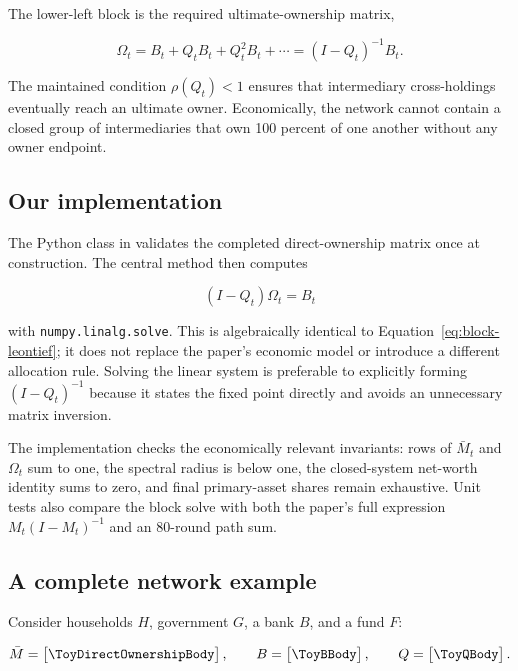 \documentclass[11pt]{article}
\newcommand{\matM}{\bar M}
\newcommand{\code}[1]{\texttt{#1}}
\begin{document}
The lower-left block is the required ultimate-ownership matrix,

\begin{equation}
  \Omega_t
  =B_t+Q_tB_t+Q_t^2B_t+\cdots
  =(I-Q_t)^{-1}B_t.
  \label{eq:block-leontief}
\end{equation}

The maintained condition $\rho(Q_t)<1$ ensures that intermediary
cross-holdings eventually reach an ultimate owner. Economically, the network
cannot contain a closed group of intermediaries that own 100 percent of one
another without any owner endpoint.

\subsection{Our implementation}

The Python class in  validates the completed
direct-ownership matrix once at construction. The central method then computes

\begin{equation}
  (I-Q_t)\Omega_t=B_t
\end{equation}

with \code{numpy.linalg.solve}. This is algebraically identical to
Equation~\eqref{eq:block-leontief}; it does not replace the paper's economic
model or introduce a different allocation rule. Solving the linear system is
preferable to explicitly forming $(I-Q_t)^{-1}$ because it states the fixed
point directly and avoids an unnecessary matrix inversion.

The implementation checks the economically relevant invariants: rows of
$\matM_t$ and $\Omega_t$ sum to one, the spectral radius is below one, the
closed-system net-worth identity sums to zero, and final primary-asset shares
remain exhaustive. Unit tests also compare the block solve with both the
paper's full expression $M_t(I-M_t)^{-1}$ and an 80-round path sum.

\subsection{A complete network example}

Consider households $H$, government $G$, a bank $B$, and a fund $F$:

\begin{equation}
  \matM=
  \begin{bmatrix}
    \ToyDirectOwnershipBody
  \end{bmatrix},
  \qquad
  B=
  \begin{bmatrix}\ToyBBody\end{bmatrix},
  \qquad
  Q=
  \begin{bmatrix}\ToyQBody\end{bmatrix}.
\end{equation}
\end{document}
